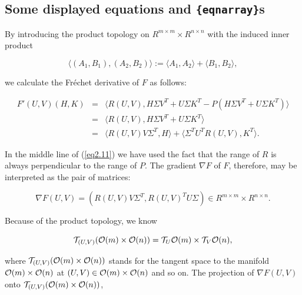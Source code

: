 \documentclass[final,leqno,onetabnum]{siamltex0315}
\begin{document}
\subsection{Some displayed equations and {\tt \{eqnarray\}}s}
     By introducing the product topology on  $R^{m \times m} \times
R^{n \times n}$  with the induced inner product
\begin{linenomath*}
\begin{equation}
\langle (A_{1},B_{1}), (A_{2},B_{2})\rangle := \langle A_{1},A_{2}\rangle 
+ \langle B_{1},B_{2}\rangle,\label{eq2.10}
\end{equation}
\end{linenomath*}
we calculate the Fr\'{e}chet derivative of  $F$  as follows:
\begin{linenomath*}
\begin{eqnarray}
 F'(U,V)(H,K) &=& \langle R(U,V),H\Sigma V^{T} + U\Sigma K^{T} -
P(H\Sigma V^{T} + U\Sigma K^{T})\rangle \nonumber \\
         &=& \langle R(U,V),H\Sigma V^{T} + U\Sigma K^{T}\rangle \label{eq2.11} \\
&=& \langle R(U,V)V\Sigma^{T},H\rangle + \langle \Sigma^{T}U^{T}R(U,V),K^{T}\rangle.     \nonumber
\end{eqnarray}
\end{linenomath*}
In the middle line of (\ref{eq2.11}) we have used the fact that the range of
$R$ is always perpendicular to the range of $P$.  The gradient $\nabla F$  of
$F$, therefore,  may be interpreted as the
pair of matrices:
\begin{linenomath*}
\begin{equation}
 \nabla F(U,V) = (R(U,V)V\Sigma^{T},R(U,V)^{T}U\Sigma ) \in
R^{m \times m} \times R^{n \times n}.       			\label{eq2.12}
\end{equation}
\end{linenomath*}
Because of the product topology, we know
\begin{linenomath*}
\begin{equation}
 {\cal T}_{(U,V)}({\cal O} (m) \times {\cal O} (n)) =
{\cal T}_{U}{\cal O} (m) \times {\cal T}_{V}{\cal O} (n),  		\label{eq2.13}
\end{equation}
\end{linenomath*}
where  ${\cal T}_{(U,V)}({\cal O} (m) \times {\cal O} (n))$  stands for the
tangent space to the manifold  ${\cal O} (m) \times {\cal O} (n)$  at  $(U,V)
\in {\cal O} (m) \times {\cal O} (n)$  and so on.  The projection of
$\nabla F(U,V)$  onto  ${\cal T}_{(U,V)}({\cal O} (m) \times {\cal O} (n))$,
\end{document}
